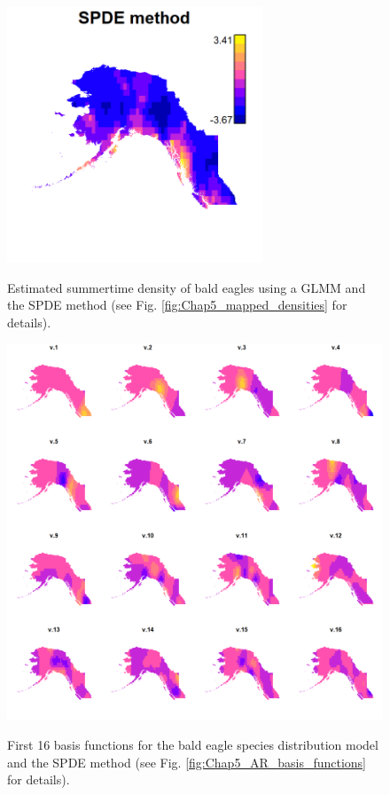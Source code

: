 \begin{figure}[!ht]
    \caption[GLMM estimates of bald eagle densities using SPDE method]{Estimated summertime density of bald eagles using a GLMM and the SPDE method (see Fig. \ref{fig:Chap5_mapped_densities} for details).}
    \centering
    \includegraphics[width=3in]{Chap_5/Mapped_densities-SPDE.png}
    \label{fig:Chap5_mapped_densities_SPDE}
\end{figure}

\begin{figure}[!ht]
    \caption[Example of basis functions for SPDE method]{First 16 basis functions for the bald eagle species distribution model and the SPDE method (see Fig. \ref{fig:Chap5_AR_basis_functions} for details).}
    \centering
    \includegraphics[width=5.5in]{Chap_5/Mapped_SPDE_basis_functions.png}
    \label{fig:Chap5_SPDE_basis_functions}
\end{figure}

